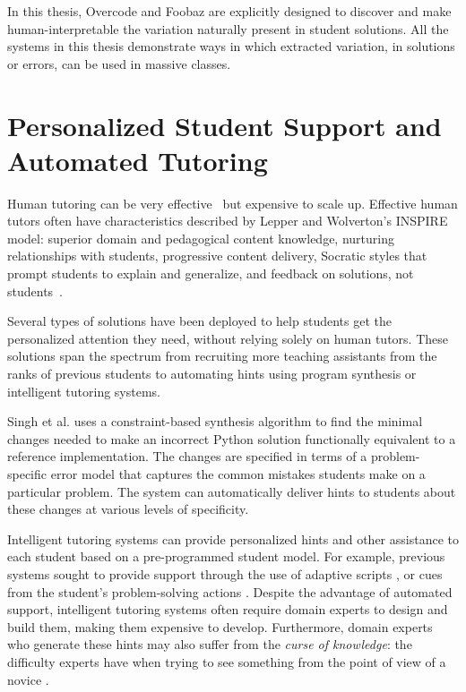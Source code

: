 In this thesis, Overcode and Foobaz are explicitly designed to discover and make human-interpretable the variation naturally present in student solutions. All the systems in this thesis demonstrate ways in which extracted variation, in solutions or errors, can be used in massive classes. 

\section{Personalized Student Support and Automated Tutoring}
Human tutoring can be very effective~\cite{bloom} but expensive to scale up. Effective human tutors often have characteristics described by Lepper and Wolverton's INSPIRE model: superior domain and pedagogical content knowledge, nurturing relationships with students, progressive content delivery, Socratic styles that prompt students to explain and generalize, and feedback on solutions, not students~\cite{wood2012role}.

Several types of solutions have been deployed to help students get the personalized attention they need, without relying solely on human tutors. These solutions span the spectrum from recruiting more teaching assistants from the ranks of previous students \cite{communityTAs} to automating hints using program synthesis or intelligent tutoring systems. 

Singh et al. \cite{rishabh} uses a constraint-based synthesis algorithm to find the minimal changes needed to make an incorrect Python solution functionally equivalent to a reference implementation. The changes are specified in terms of a problem-specific error model that captures the common mistakes students make on a particular problem. The system can automatically deliver hints to students about these changes at various levels of specificity. 

Intelligent tutoring systems can provide personalized hints and other assistance to each student based on a pre-programmed student model. For example, previous systems sought to provide support through the use of adaptive scripts \cite{kumar2007tutorial}, or cues from the student's problem-solving actions \cite{diziol}. Despite the advantage of automated support, intelligent tutoring systems often require domain experts to design and build them, making them expensive to develop.  Furthermore, domain experts who generate these hints may also suffer from the {\it curse of knowledge}: the difficulty experts have when trying to see something from the point of view of a novice \cite{curse}. 

